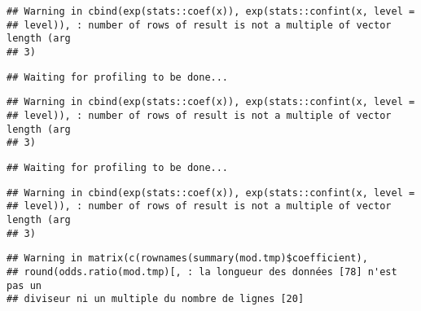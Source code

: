 \documentclass[]{article}
\newenvironment{Shaded}{\begin{snugshade}}{\end{snugshade}}
\newcommand{\KeywordTok}[1]{\textcolor[rgb]{0.13,0.29,0.53}{\textbf{#1}}}
\newcommand{\DataTypeTok}[1]{\textcolor[rgb]{0.13,0.29,0.53}{#1}}
\newcommand{\StringTok}[1]{\textcolor[rgb]{0.31,0.60,0.02}{#1}}
\newcommand{\OperatorTok}[1]{\textcolor[rgb]{0.81,0.36,0.00}{\textbf{#1}}}
\newcommand{\NormalTok}[1]{#1}
\begin{document}
\begin{verbatim}
## Warning in cbind(exp(stats::coef(x)), exp(stats::confint(x, level =
## level)), : number of rows of result is not a multiple of vector length (arg
## 3)
\end{verbatim}

\begin{verbatim}
## Waiting for profiling to be done...
\end{verbatim}

\begin{verbatim}
## Warning in cbind(exp(stats::coef(x)), exp(stats::confint(x, level =
## level)), : number of rows of result is not a multiple of vector length (arg
## 3)
\end{verbatim}

\begin{verbatim}
## Waiting for profiling to be done...
\end{verbatim}

\begin{verbatim}
## Warning in cbind(exp(stats::coef(x)), exp(stats::confint(x, level =
## level)), : number of rows of result is not a multiple of vector length (arg
## 3)
\end{verbatim}

\begin{verbatim}
## Warning in matrix(c(rownames(summary(mod.tmp)$coefficient),
## round(odds.ratio(mod.tmp)[, : la longueur des données [78] n'est pas un
## diviseur ni un multiple du nombre de lignes [20]
\end{verbatim}

\begin{Shaded}
\end{Shaded}
\end{document}
